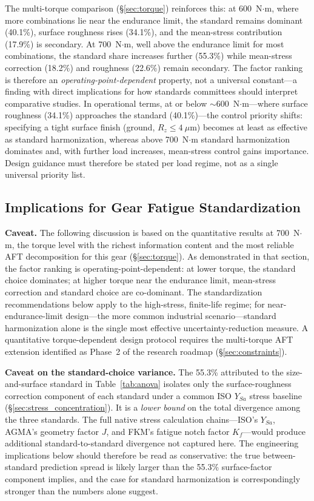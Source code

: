 \documentclass[twocolumn,12pt,a4paper]{article}
\begin{document}
The multi-torque comparison (\S\ref{sec:torque}) reinforces this:
at 600~N$\cdot$m, where more combinations lie near the endurance
limit, the standard remains dominant (40.1\%), surface roughness rises
(34.1\%), and the mean-stress contribution (17.9\%) is secondary. At
700~N$\cdot$m, well above the endurance limit for most combinations,
the standard share increases further (55.3\%) while mean-stress
correction (18.2\%) and roughness (22.6\%) remain secondary. The
factor ranking is therefore an
\emph{operating-point-dependent}
property, not a universal constant---a finding with direct implications
for how standards committees should interpret comparative studies. In
operational terms, at or below $\sim$600~N$\cdot$m---where surface
roughness (34.1\%) approaches the standard (40.1\%)---the control
priority shifts: specifying a tight surface finish (ground,
$R_z \leq 4~\mu$m) becomes at least as effective as standard
harmonization, whereas above 700~N$\cdot$m standard harmonization
dominates and, with further load increases, mean-stress control gains
importance. Design guidance must therefore be stated per load regime,
not as a single universal priority list.

\subsection{Implications for Gear Fatigue Standardization}

\textbf{Caveat.} The following discussion is based on the quantitative
results at 700~N$\cdot$m, the torque level with the richest
information content and the most reliable AFT decomposition for this
gear (\S\ref{sec:torque}). As
demonstrated in that section, the factor ranking is
operating-point-dependent: at lower torque, the standard choice
dominates; at higher torque near the endurance limit, mean-stress
correction and standard choice are co-dominant. The standardization
recommendations below apply to
the high-stress, finite-life regime; for near-endurance-limit
design---the more common industrial scenario---standard harmonization
alone is the single most effective uncertainty-reduction measure.
A quantitative torque-dependent design protocol requires the
multi-torque AFT extension identified as Phase~2 of the research
roadmap (\S\ref{sec:constraints}).

\textbf{Caveat on the standard-choice variance.} The 55.3\% attributed
to the size-and-surface standard in Table~\ref{tab:anova} isolates
only the surface-roughness correction component of each standard
under a common ISO $Y_{Sa}$ stress baseline
(\S\ref{sec:stress_concentration}). It is a \emph{lower bound} on the
total divergence among the three standards. The full native stress
calculation chains---ISO's $Y_{Sa}$, AGMA's geometry factor $J$, and
FKM's fatigue notch factor $K_f$---would produce additional
standard-to-standard divergence not captured here. The engineering
implications below should therefore be read as conservative: the true
between-standard prediction spread is likely larger than the 55.3\%
surface-factor component implies, and the case for standard
harmonization is correspondingly stronger than the numbers alone
suggest.
\end{document}

